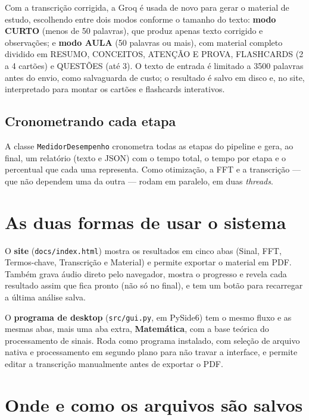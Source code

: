 \documentclass[11pt,a4paper]{article}
\begin{document}
Com a transcrição corrigida, a Groq é usada de novo para gerar o material de estudo, escolhendo entre dois modos conforme o tamanho do texto: \textbf{modo CURTO} (menos de 50 palavras), que produz apenas texto corrigido e observações; e \textbf{modo AULA} (50 palavras ou mais), com material completo dividido em RESUMO, CONCEITOS, ATENÇÃO E PROVA, FLASHCARDS (2 a 4 cartões) e QUESTÕES (até 3). O texto de entrada é limitado a 3500 palavras antes do envio, como salvaguarda de custo; o resultado é salvo em disco e, no site, interpretado para montar os cartões e flashcards interativos.

\subsection{Cronometrando cada etapa}

A classe \texttt{MedidorDesempenho} cronometra todas as etapas do pipeline e gera, ao final, um relatório (texto e JSON) com o tempo total, o tempo por etapa e o percentual que cada uma representa. Como otimização, a FFT e a transcrição --- que não dependem uma da outra --- rodam em paralelo, em duas \emph{threads}.

\section{As duas formas de usar o sistema}

O \textbf{site} (\texttt{docs/index.html}) mostra os resultados em cinco abas (Sinal, FFT, Termos-chave, Transcrição e Material) e permite exportar o material em PDF. Também grava áudio direto pelo navegador, mostra o progresso e revela cada resultado assim que fica pronto (não só no final), e tem um botão para recarregar a última análise salva.

O \textbf{programa de desktop} (\texttt{src/gui.py}, em PySide6) tem o mesmo fluxo e as mesmas abas, mais uma aba extra, \textbf{Matemática}, com a base teórica do processamento de sinais. Roda como programa instalado, com seleção de arquivo nativa e processamento em segundo plano para não travar a interface, e permite editar a transcrição manualmente antes de exportar o PDF.

\section{Onde e como os arquivos são salvos}
\end{document}
